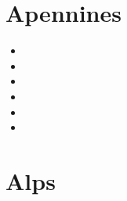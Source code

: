 \section{Apennines}

\begin{small}
\begin{itemize}
\item[\nineteenninetyeight] 
\item[\twothousandseven] 
\item[\twothousandnine] 
\item[\twothousandfourteen] 
\item[\twothousandfifteen] 
\item[\twothousandtwenty] 
\end{itemize}
\end{small}

\section{Alps}

